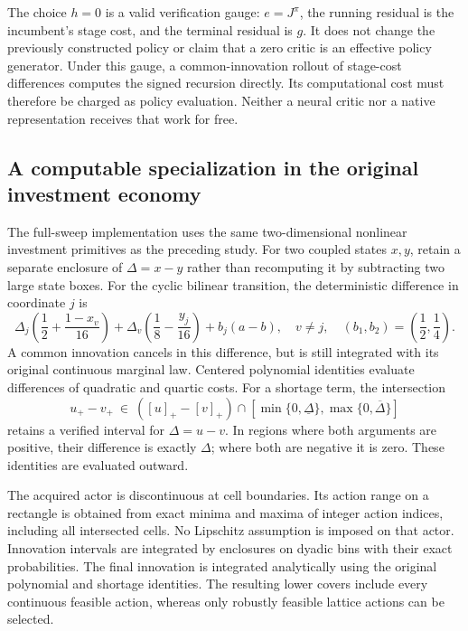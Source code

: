 The choice $h=0$ is a valid verification gauge: $e=J^\pi$, the running residual is the incumbent's stage cost, and the terminal residual is $g$. It does not change the previously constructed policy or claim that a zero critic is an effective policy generator. Under this gauge, a common-innovation rollout of stage-cost differences computes the signed recursion directly. Its computational cost must therefore be charged as policy evaluation. Neither a neural critic nor a native representation receives that work for free.

\subsection{A computable specialization in the original investment economy}
The full-sweep implementation uses the same two-dimensional nonlinear investment primitives as the preceding study. For two coupled states $x,y$, retain a separate enclosure of $\Delta=x-y$ rather than recomputing it by subtracting two large state boxes. For the cyclic bilinear transition, the deterministic difference in coordinate $j$ is
\[
 \Delta_j\left(\frac12+\frac{1-x_v}{16}\right)
 +\Delta_v\left(\frac18-\frac{y_j}{16}\right)+b_j(a-b),
 \quad v\ne j,\quad (b_1,b_2)=\left(\frac12,\frac14\right).
\]
A common innovation cancels in this difference, but is still integrated with its original continuous marginal law. Centered polynomial identities evaluate differences of quadratic and quartic costs. For a shortage term, the intersection
\[
 u_+-v_+\ \in\ ( [u]_+-[v]_+ )\cap
       [\min\{0,\underline\Delta\},\max\{0,\overline\Delta\}]
\]
retains a verified interval for $\Delta=u-v$. In regions where both arguments are positive, their difference is exactly $\Delta$; where both are negative it is zero. These identities are evaluated outward.

The acquired actor is discontinuous at cell boundaries. Its action range on a rectangle is obtained from exact minima and maxima of integer action indices, including all intersected cells. No Lipschitz assumption is imposed on that actor. Innovation intervals are integrated by enclosures on dyadic bins with their exact probabilities. The final innovation is integrated analytically using the original polynomial and shortage identities. The resulting lower covers include every continuous feasible action, whereas only robustly feasible lattice actions can be selected.

